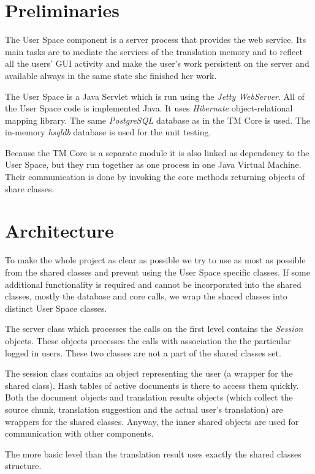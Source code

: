 \section{Preliminaries}

The User Space component is a server process that provides the web service. Its main tasks are to mediate the services of the translation memory and to reflect all the users' GUI activity and make the user's work persistent on the server and available always in the same state she finished her work.

The User Space is a Java Servlet which is run using the \emph{Jetty WebServer}. All of the User Space code is implemented Java. It uses \emph{Hibernate} object-relational mapping library. The same \emph{PostgreSQL} database as in the TM Core is used. The in-memory \emph{hsqldb} database is used for the unit testing.

Because the TM Core is a separate module it is also linked as dependency to the User Space, but they run together as one process in one Java Virtual Machine. Their communication is done by invoking the core methods returning objects of share classes.

\section{Architecture}

To make the whole project as clear as possible we try to use as most as possible from the shared classes and prevent using the User Space specific classes. If some additional functionality is required and cannot be incorporated into the shared classes, mostly the database and core calls, we wrap the shared classes into distinct User Space classes.

The server class which processes the calls on the first level contains the {\it Session} objects. These objects processes the calls with association the the particular logged in users. These two classes are not a part of the shared classes set.

The session class contains an object representing the user (a wrapper for the shared class). Hash tables of active documents is there to access  them quickly. Both the document objects and translation results objects (which collect the source chunk, translation suggestion and the actual user's translation) are wrappers for the shared classes. Anyway, the inner shared objects are used for communication with other components.

The more basic level than the translation result uses exactly the shared classes structure.

